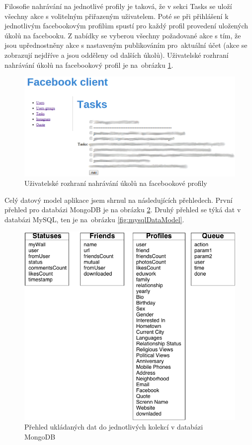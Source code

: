 \documentclass[thesis=M,czech]{FITthesis}[2013/05/10]
\begin{document}
Filosofie nahrávání na jednotlivé profily je taková, že v sekci Tasks se uloží všechny akce s volitelným přiřazeným uživatelem. Poté se při přihlášení k jednotlivým facebookovým profilům spustí pro každý profil provedení uložených úkolů na facebooku. Z nabídky se vyberou všechny požadované akce s tím, že jsou upřednostněny akce s nastaveným publikováním pro~aktuální účet (akce se zobrazují nejdříve a jsou odděleny od dalších úkolů). Uživatelské rozhraní nahrávání úkolů na facebookový profil je na~obrázku \ref{fig:fcUserTask}.

\begin{figure}[h]
\begin{center}
\includegraphics[width=5in]{figures/fcUserTask.png}
\caption{Uživatelské rozhraní nahrávání úkolů na facebookové profily}
\label{fig:fcUserTask}
\end{center}
\end{figure}

Celý datový model aplikace jsem shrnul na následujících přehledech. První přehled pro databázi MongoDB je na obrázku \ref{fig:mongoDataModel}. Druhý přehled se týká dat v databázi MySQL, ten je na~obrázku \ref{fig:mysqlDataModel}.

\begin{figure}[h]
\begin{center}
\includegraphics[width=5in]{figures/mongoDataModel.png}
\caption{Přehled ukládaných dat do jednotlivých kolekcí v databázi MongoDB}
\label{fig:mongoDataModel}
\end{center}
\end{figure}
\end{document}
